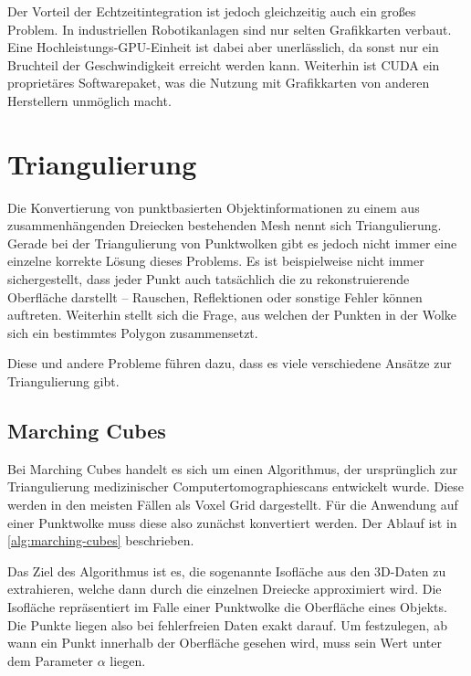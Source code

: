 Der Vorteil der Echtzeitintegration ist jedoch gleichzeitig auch ein großes Problem.
In industriellen Robotikanlagen sind nur selten Grafikkarten verbaut.
Eine Hochleistungs-GPU-Einheit ist dabei aber unerlässlich, da sonst nur ein Bruchteil der Geschwindigkeit erreicht werden kann.
Weiterhin ist CUDA ein proprietäres Softwarepaket, was die Nutzung mit Grafikkarten von anderen Herstellern unmöglich macht.



\section{Triangulierung}
\label{sec:triangulation}

Die Konvertierung von punktbasierten Objektinformationen zu einem aus zusammenhängenden Dreiecken bestehenden Mesh nennt sich Triangulierung.
Gerade bei der Triangulierung von Punktwolken gibt es jedoch nicht immer eine einzelne korrekte Lösung dieses Problems.
Es ist beispielweise nicht immer sichergestellt, dass jeder Punkt auch tatsächlich die zu rekonstruierende Oberfläche darstellt -- Rauschen, Reflektionen oder sonstige Fehler können auftreten.
Weiterhin stellt sich die Frage, aus welchen der Punkten in der Wolke sich ein bestimmtes Polygon zusammensetzt.

Diese und andere Probleme führen dazu, dass es viele verschiedene Ansätze zur Triangulierung gibt.


\subsection{Marching Cubes}
\label{subsec:marching-cubes}

Bei Marching Cubes \cite{lorensen1987marching} handelt es sich um einen Algorithmus, der ursprünglich zur Triangulierung medizinischer Computertomographiescans entwickelt wurde.
Diese werden in den meisten Fällen als Voxel Grid dargestellt.
Für die Anwendung auf einer Punktwolke muss diese also zunächst konvertiert werden.
Der Ablauf ist in \autoref{alg:marching-cubes} beschrieben.

Das Ziel des Algorithmus ist es, die sogenannte Isofläche aus den 3D-Daten zu extrahieren, welche dann durch die einzelnen Dreiecke approximiert wird.
Die Isofläche repräsentiert im Falle einer Punktwolke die Oberfläche eines Objekts.
Die Punkte liegen also bei fehlerfreien Daten exakt darauf.
Um festzulegen, ab wann ein Punkt innerhalb der Oberfläche gesehen wird, muss sein Wert unter dem Parameter $\alpha$ liegen.

